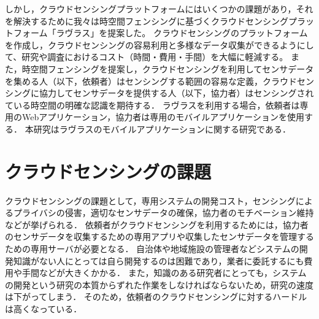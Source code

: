 しかし，クラウドセンシングプラットフォームにはいくつかの課題があり，それを解決するために我々は時空間フェンシングに基づくクラウドセンシングプラットフォーム「ラヴラス」を提案した。
クラウドセンシングのプラットフォームを作成し，クラウドセンシングの容易利用と多様なデータ収集ができるようにして、研究や調査におけるコスト（時間・費用・手間）を大幅に軽減する。
また，時空間フェンシングを提案し，クラウドセンシングを利用してセンサデータを集める人（以下，依頼者）はセンシングする範囲の容易な定義，クラウドセンシングに協力してセンサデータを提供する人（以下，協力者）はセンシングされている時空間の明確な認識を期待する．
ラヴラスを利用する場合，依頼者は専用のWebアプリケーション，協力者は専用のモバイルアプリケーションを使用する．
本研究はラヴラスのモバイルアプリケーションに関する研究である．



\section{クラウドセンシングの課題}

クラウドセンシングの課題として，専用システムの開発コスト，センシングによるプライバシの侵害，適切なセンサデータの確保，協力者のモチベーション維持などが挙げられる．
依頼者がクラウドセンシングを利用するためには，協力者のセンサデータを収集するための専用アプリや収集したセンサデータを管理するための専用サーバが必要となる．
自治体や地域施設の管理者などシステムの開発知識がない人にとっては自ら開発するのは困難であり，業者に委託するにも費用や手間などが大きくかかる．
また，知識のある研究者にとっても，システムの開発という研究の本質からずれた作業をしなければならないため，研究の速度は下がってしまう．
そのため，依頼者のクラウドセンシングに対するハードルは高くなっている．

